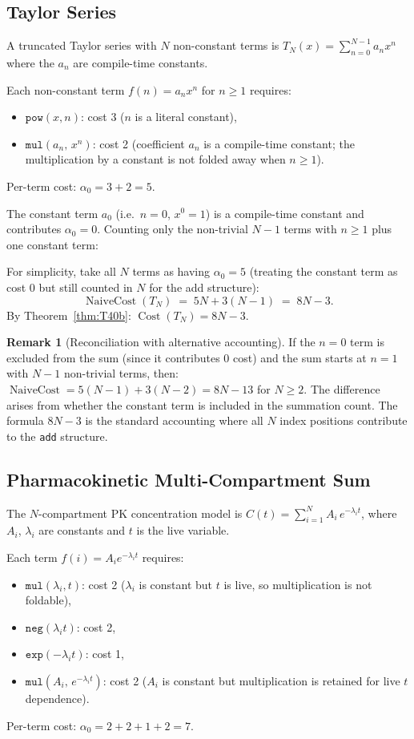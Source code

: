 \documentclass[12pt,a4paper]{article}
\theoremstyle{definition}
\newtheorem{remark}[theorem]{Remark}
\newcommand{\Cost}{\operatorname{Cost}}
\newcommand{\NC}{\operatorname{NaiveCost}}
\begin{document}
\subsection{Taylor Series}

A truncated Taylor series with $N$ non-constant terms is
$T_N(x) = \sum_{n=0}^{N-1} a_n x^n$ where the $a_n$ are compile-time
constants.

Each non-constant term $f(n) = a_n x^n$ for $n \geq 1$ requires:
\begin{itemize}
  \item $\texttt{pow}(x, n)$: cost 3 ($n$ is a literal constant),
  \item $\texttt{mul}(a_n,\, x^n)$: cost 2 (coefficient $a_n$ is a
        compile-time constant; the multiplication by a constant is not
        folded away when $n \geq 1$).
\end{itemize}
Per-term cost: $\alpha_0 = 3 + 2 = 5$.

The constant term $a_0$ (i.e.\ $n=0$, $x^0 = 1$) is a compile-time constant
and contributes $\alpha_0 = 0$.  Counting only the non-trivial $N-1$ terms
with $n \geq 1$ plus one constant term:

For simplicity, take all $N$ terms as having $\alpha_0 = 5$ (treating the
constant term as cost 0 but still counted in $N$ for the add structure):
\[
  \NC(T_N) \;=\; 5N + 3(N-1) \;=\; 8N - 3.
\]
By Theorem~\ref{thm:T40b}: $\Cost(T_N) = 8N - 3$.

\begin{remark}[Reconciliation with alternative accounting]
If the $n=0$ term is excluded from the sum (since it contributes 0 cost) and
the sum starts at $n=1$ with $N-1$ non-trivial terms, then:
$\NC = 5(N-1) + 3(N-2) = 8N - 13$ for $N \geq 2$.  The difference arises
from whether the constant term is included in the summation count.  The
formula $8N - 3$ is the standard accounting where all $N$ index positions
contribute to the \texttt{add} structure.
\end{remark}

\subsection{Pharmacokinetic Multi-Compartment Sum}

The $N$-compartment PK concentration model is
$C(t) = \sum_{i=1}^{N} A_i\, e^{-\lambda_i t}$, where $A_i$, $\lambda_i$
are constants and $t$ is the live variable.

Each term $f(i) = A_i e^{-\lambda_i t}$ requires:
\begin{itemize}
  \item $\texttt{mul}(\lambda_i, t)$: cost 2 ($\lambda_i$ is constant but
        $t$ is live, so multiplication is not foldable),
  \item $\texttt{neg}(\lambda_i t)$: cost 2,
  \item $\texttt{exp}(-\lambda_i t)$: cost 1,
  \item $\texttt{mul}(A_i,\, e^{-\lambda_i t})$: cost 2 ($A_i$ is constant
        but multiplication is retained for live $t$ dependence).
\end{itemize}
Per-term cost: $\alpha_0 = 2 + 2 + 1 + 2 = 7$.
\end{document}
